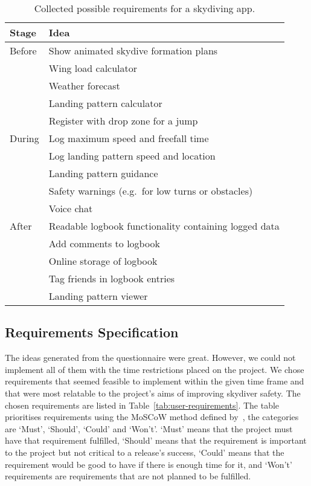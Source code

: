 \begin{table*}[ht]
  \centering
  \caption{Collected possible requirements for a skydiving app.}\label{tab:user-ideas}
  \begin{tabular}{@{}ll@{}}
    \toprule
    \textbf{Stage}  & \textbf{Idea} \\
    \midrule
    Before & Show animated skydive formation plans \\
           & Wing load calculator \\
           & Weather forecast \\
           & Landing pattern calculator \\
           & Register with drop zone for a jump \vspace{2mm} \\
    During & Log maximum speed and freefall time \\
           & Log landing pattern speed and location \\
           & Landing pattern guidance \\
           & Safety warnings (e.g.\ for low turns or obstacles) \\
           & Voice chat \vspace{2mm} \\
    After  & Readable logbook functionality containing logged data \\
           & Add comments to logbook \\
           & Online storage of logbook \\
           & Tag friends in logbook entries \\
           & Landing pattern viewer \\
    \bottomrule
  \end{tabular}
\end{table*}

\subsection{Requirements Specification}
The ideas generated from the questionnaire were great. However, we could not implement all of them with the time restrictions placed on the project. We chose requirements that seemed feasible to implement within the given time frame and that were most relatable to the project's aims of improving skydiver safety. The chosen requirements are listed in Table~\vref{tab:user-requirements}. The table prioritises requirements using the MoSCoW method defined by~\citeauthor{clegg_case_1994}, the categories are `Must', `Should', `Could' and `Won't'. `Must' means that the project must have that requirement fulfilled, `Should' means that the requirement is important to the project but not critical to a release's success, `Could' means that the requirement would be good to have if there is enough time for it, and `Won't' requirements are requirements that are not planned to be fulfilled.

